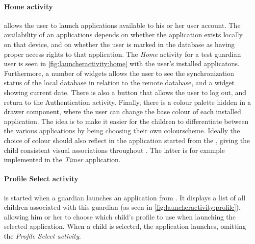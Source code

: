 \paragraph{Home activity} allows the user to launch \giraf applications available to his or her user account. 
The availability of an applications depends on whether the application exists locally on that device, and on whether the user is marked in the database as having proper access rights to that application.
The \textit{Home} activity for a test guardian user is seen in \cref{fig:launcheractivity:home} with the user's installed \giraf applicatons.
Furthermore, a number of widgets allows the user to see the synchronization status of the local database in relation to the remote database, and a widget showing current date. 
There is also a button that allows the user to log out, and return to the Authentication activity.
Finally, there is a colour palette hidden in a drawer component, where the user can change the base colour of each installed application. 
The idea is to make it easier for the children to differentiate between the various applications by being choosing their own colourscheme. 
Ideally the choice of colour should also reflect in the application started from the \launcher, giving the child consistent visual associations throughout \giraf.
The latter is for example implemented in the \textit{Timer} application.

\paragraph{Profile Select activity} is started when a guardian launches an application from \launcher. 
It displays a list of all children associated with this guardian (as seen in \cref{fig:launcheractivity:profile}), allowing him or her to choose which child's profile to use when launching the selected application. 
When a child is selected, the application launches, omitting the \textit{Profile Select activity}.